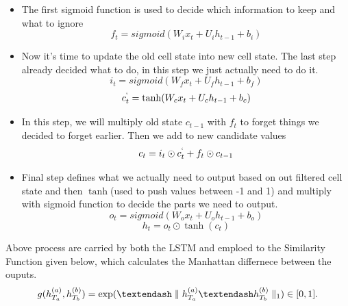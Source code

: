 \begin{itemize}
\item The first sigmoid function is used to decide which information to keep and what to ignore
$$f_t=sigmoid(W_ix_t + U_ih_{t-1}+b_i)$$
\item Now it's time to update the old cell state into new cell state. The last step already decided what to do, in this step we just actually need to do it.
$$i_t=sigmoid(W_fx_t + U_fh_{t-1}+b_f)$$
$$c_t^`=\tanh(W_cx_t + U_ch_{t-1}+b_c)$$
\item In this step, we will multiply old state $c_{t-1}$ with $f_t$ to forget things we decided to forget earlier. Then we add to new candidate values
$$c_t=i_t \odot c_t^` + f_t \odot c_{t-1}$$
\item Final step defines what we actually need to output based on out filtered cell state and then $\tanh$(used to push values between -1 and 1) and multiply with sigmoid function to decide the parts we need to output.
$$o_t=sigmoid(W_ox_t + U_oh_{t-1}+b_o)$$
$$h_t=o_t \odot \tanh(c_t)$$
\end{itemize}

Above process are carried by both the LSTM and emploed to the Similarity Function given below, which calculates the Manhattan differnece between the ouputs.
$$g(h_{T_a}^{(a)},h_{T_b}^{(b)})=\exp(\textendash \parallel h_{T_a}^{(a)} \textendash h_{T_b}^{(b)}\parallel_1) \in [0,1]. $$